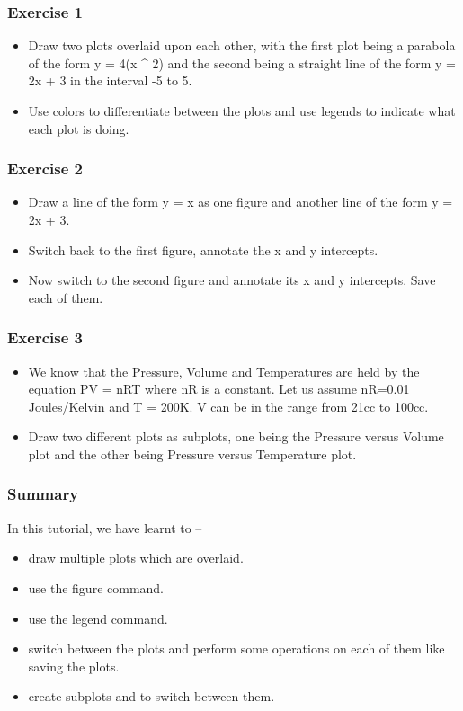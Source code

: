\documentclass[presentation]{beamer}
\begin{document}
\begin{frame}
\frametitle{Exercise 1}
\label{sec-4}


\begin{itemize}
\item Draw two plots overlaid upon each other, with the first plot
    being a parabola of the form y = 4(x \^{} 2) and the second being a
    straight line of the form y = 2x + 3 in the interval -5 to 5.
\item Use colors to differentiate between the plots and use legends to
    indicate what each plot is doing.
\end{itemize}
\end{frame}
\begin{frame}
\frametitle{Exercise 2}
\label{sec-5}


\begin{itemize}
\item Draw a line of the form y = x as one figure and another line
    of the form y = 2x + 3.
\item Switch back to the first figure, annotate the x and y intercepts.
\item Now switch to the second figure and annotate its x and y intercepts.
    Save each of them.
\end{itemize}
\end{frame}
\begin{frame}
\frametitle{Exercise 3}
\label{sec-6}


\begin{itemize}
\item We know that the Pressure, Volume and Temperatures are held by
    the equation PV = nRT where nR is a constant. Let us assume
    nR=0.01 Joules/Kelvin and T = 200K.
    V can be in the range from 21cc to 100cc.
\item Draw two different plots as subplots, one being the Pressure
    versus Volume plot and the other being Pressure versus Temperature
    plot.
\end{itemize}
\end{frame}
\begin{frame}
\frametitle{Summary}
\label{sec-7}

  In this tutorial, we have learnt to –

\begin{itemize}
\item draw multiple plots which are overlaid.
\item use the figure command.
\item use the legend command.
\item switch between the plots and perform some operations on each
    of them like saving the plots.
\item create subplots and to switch between them.
\end{itemize}
\end{frame}
\end{document}
